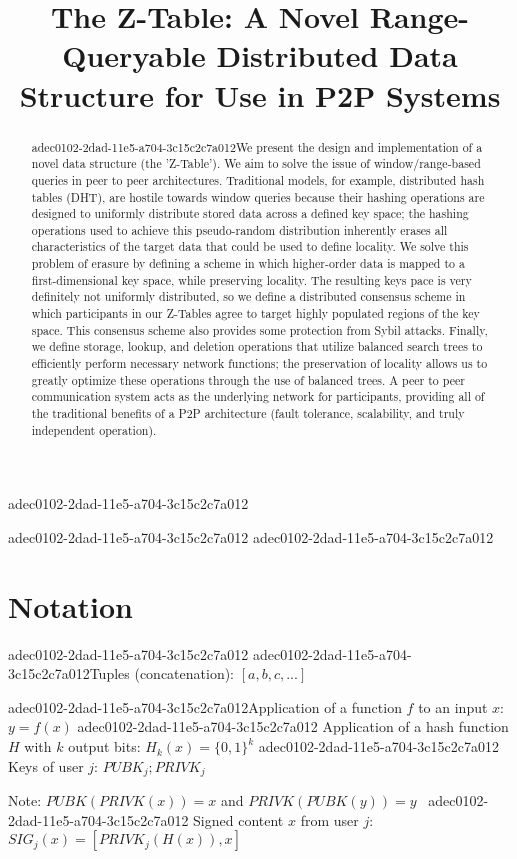 \documentclass[12pt]{article}
\title{The Z-Table: A Novel Range-Queryable Distributed Data Structure for Use in P2P Systems}
\begin{document}
adec0102-2dad-11e5-a704-3c15c2c7a012\maketitle
adec0102-2dad-11e5-a704-3c15c2c7a012
adec0102-2dad-11e5-a704-3c15c2c7a012\begin{abstract}
adec0102-2dad-11e5-a704-3c15c2c7a012We present the design and implementation of a novel data structure (the 'Z-Table'). We aim to solve the issue of window/range-based queries in peer to peer architectures. Traditional models, for example,  distributed hash tables (DHT), are hostile towards window queries because their hashing operations are designed to uniformly distribute stored data across a defined key space; the hashing operations used to achieve this pseudo-random distribution inherently erases all characteristics of the target data that could be used to define locality. We solve this problem of erasure by defining a scheme in which higher-order data is mapped to a first-dimensional key space, while preserving locality. The resulting keys pace is very definitely not uniformly distributed, so we define a distributed consensus scheme in which participants in our Z-Tables agree to target highly populated regions of the key space. This consensus scheme also provides some protection from Sybil attacks. Finally, we define storage, lookup, and deletion operations that utilize balanced search trees to efficiently perform necessary network functions; the preservation of locality allows us to greatly optimize these operations through the use of balanced trees. A peer to peer communication system acts as the underlying network for participants, providing all of the traditional benefits of a P2P architecture (fault tolerance, scalability, and truly independent operation).
\end{abstract}

\section{Notation}
adec0102-2dad-11e5-a704-3c15c2c7a012
adec0102-2dad-11e5-a704-3c15c2c7a012Tuples (concatenation): $[a,b,c,...]$

adec0102-2dad-11e5-a704-3c15c2c7a012Application of a function $f$ to an input $x$: $y=f(x)$
adec0102-2dad-11e5-a704-3c15c2c7a012
Application of a hash function $H$ with $k$ output bits: $H_{k}(x) = \{0,1\}^k$
adec0102-2dad-11e5-a704-3c15c2c7a012
Keys of user $j$: $ PUBK_j; PRIVK_j $

Note: $PUBK(PRIVK(x)) = x$ and $PRIVK(PUBK(y)) = y$~
adec0102-2dad-11e5-a704-3c15c2c7a012
Signed content $x$ from user $j$: $SIG_j(x) = \left[ PRIVK_j( H(x) ), x \right]$
\end{document}
